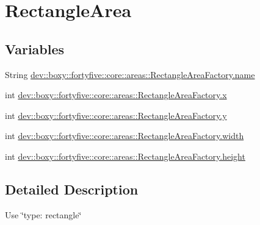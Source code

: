 \hypertarget{group___rectangle_area}{
\section{RectangleArea}
\label{db/d94/group___rectangle_area}
}
\subsection*{Variables}
\begin{DoxyCompactItemize}
\item 
String \hyperlink{group___rectangle_area_gaa9dd1bb57ebf508cd2a50260ef3094cc}{dev::boxy::fortyfive::core::areas::RectangleAreaFactory.name}
\item 
int \hyperlink{group___rectangle_area_gae77066a4844139558dd4e05beb887764}{dev::boxy::fortyfive::core::areas::RectangleAreaFactory.x}
\item 
int \hyperlink{group___rectangle_area_ga40b3b0422d96ddc0c318efaeff239cc5}{dev::boxy::fortyfive::core::areas::RectangleAreaFactory.y}
\item 
int \hyperlink{group___rectangle_area_ga4eef08a509ab1d413d231624d4625eb2}{dev::boxy::fortyfive::core::areas::RectangleAreaFactory.width}
\item 
int \hyperlink{group___rectangle_area_gaa7b0ba57b53529eb79a8d671cce6e073}{dev::boxy::fortyfive::core::areas::RectangleAreaFactory.height}
\end{DoxyCompactItemize}


\subsection{Detailed Description}
Use \char`\"{}type: rectangle\char`\"{} 

